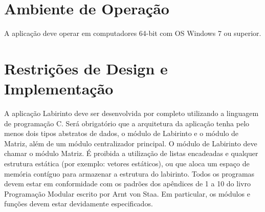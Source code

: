 \section{Ambiente de Operação}
A aplicação deve operar em computadores 64-bit com OS Windows 7 ou superior.

\section{Restrições de Design e Implementação}
A aplicação Labirinto deve ser desenvolvida por completo utilizando a linguagem de programação C. Será obrigatório que a arquitetura da aplicação tenha pelo menos dois tipos abstratos de dados, o módulo de Labirinto e o módulo de Matriz, além de um módulo centralizador principal. O módulo de Labirinto deve chamar o módulo Matriz. É proibida a utilização de listas encadeadas e qualquer estrutura estática (por exemplo: vetores estáticos), ou que aloca um espaço de memória contíguo para armazenar a estrutura do labirinto. Todos os programas devem estar em conformidade com os padrões dos apêndices de 1 a 10 do livro Programação Modular escrito por Arnt von Staa. Em particular, os módulos e funções devem estar devidamente especificados.



